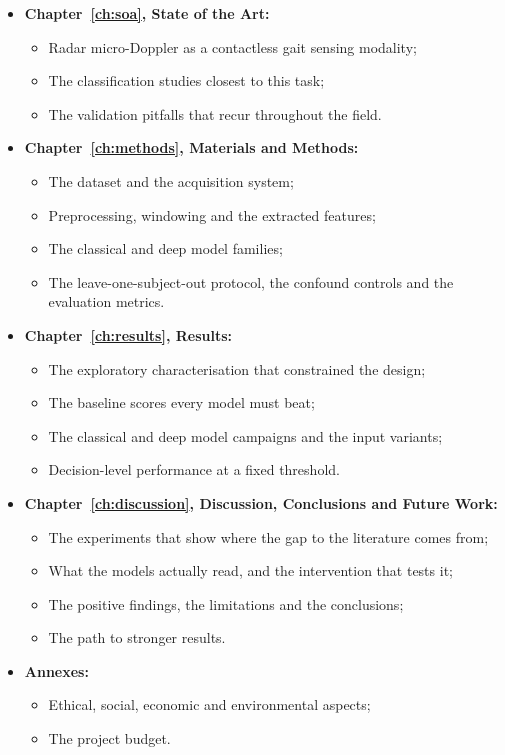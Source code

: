 \begin{itemize}
  \item \textbf{Chapter~\ref{ch:soa}, State of the Art:}
    \begin{itemize}
      \item Radar micro-Doppler as a contactless gait sensing modality;
      \item The classification studies closest to this task;
      \item The validation pitfalls that recur throughout the field.
    \end{itemize}
  \item \textbf{Chapter~\ref{ch:methods}, Materials and Methods:}
    \begin{itemize}
      \item The dataset and the acquisition system;
      \item Preprocessing, windowing and the extracted features;
      \item The classical and deep model families;
      \item The leave-one-subject-out protocol, the confound controls and
            the evaluation metrics.
    \end{itemize}
  \item \textbf{Chapter~\ref{ch:results}, Results:}
    \begin{itemize}
      \item The exploratory characterisation that constrained the design;
      \item The baseline scores every model must beat;
      \item The classical and deep model campaigns and the input variants;
      \item Decision-level performance at a fixed threshold.
    \end{itemize}
  \item \textbf{Chapter~\ref{ch:discussion}, Discussion, Conclusions and Future Work:}
    \begin{itemize}
      \item The experiments that show where the gap to the literature
            comes from;
      \item What the models actually read, and the intervention that tests
            it;
      \item The positive findings, the limitations and the conclusions;
      \item The path to stronger results.
    \end{itemize}
  \item \textbf{Annexes:}
    \begin{itemize}
      \item Ethical, social, economic and environmental aspects;
      \item The project budget.
    \end{itemize}
\end{itemize}

